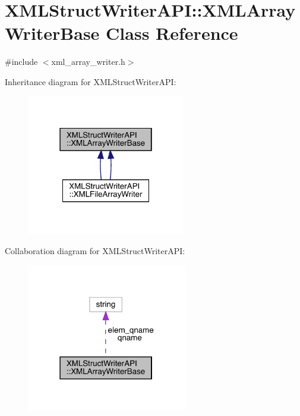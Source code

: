 \hypertarget{classXMLStructWriterAPI_1_1XMLArrayWriterBase}{}\section{X\+M\+L\+Struct\+Writer\+A\+PI\+:\+:X\+M\+L\+Array\+Writer\+Base Class Reference}
\label{classXMLStructWriterAPI_1_1XMLArrayWriterBase}


{\ttfamily \#include $<$xml\+\_\+array\+\_\+writer.\+h$>$}



Inheritance diagram for X\+M\+L\+Struct\+Writer\+A\+PI\+:\nopagebreak
\begin{figure}[H]
\begin{center}
\leavevmode
\includegraphics[width=195pt]{df/d38/classXMLStructWriterAPI_1_1XMLArrayWriterBase__inherit__graph}
\end{center}
\end{figure}


Collaboration diagram for X\+M\+L\+Struct\+Writer\+A\+PI\+:\nopagebreak
\begin{figure}[H]
\begin{center}
\leavevmode
\includegraphics[width=198pt]{d0/dd8/classXMLStructWriterAPI_1_1XMLArrayWriterBase__coll__graph}
\end{center}
\end{figure}
